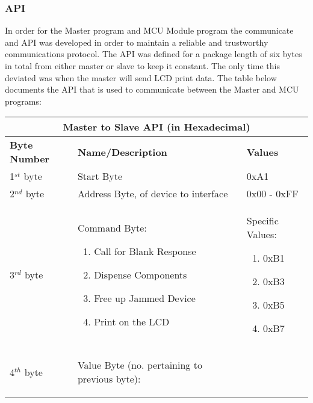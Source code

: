 \documentclass[a4paper,11pt]{article}
\numberwithin{figure}{section}
\numberwithin{table}{section}
\begin{document}
\subsubsection{API}
\label{subsubsec:API}
In order for the Master program and MCU Module program the communicate and API was developed in order to maintain a reliable and trustworthy communications protocol. The API was defined for a package length of six bytes in total from either master or slave to keep it constant. The only time this deviated was when the master will send LCD print data. The table below documents the API that is used to communicate between the Master and MCU programs:
	\begin{center}
		\begin{table}[ht]
			\centering
			\begin{tabular}{| m{3cm} | m{5cm}| m{5cm} |}
			\hline
			\multicolumn{3}{|c|}{\bfseries Master to Slave API (in Hexadecimal)}\\
			\hline
			\bfseries{Byte Number}  & \bfseries{Name/Description} & \bfseries{Values} \\
			\hline
			1$^{st}$ byte & Start Byte & 0xA1\\
			\hline
			2$^{nd}$ byte & Address Byte, of device to interface & 0x00 - 0xFF \\
			\hline
			3$^{rd}$ byte & Command Byte: \begin{enumerate}
											\setlength{\itemsep}{0pt}
   											\setlength{\parskip}{0pt}
    										\setlength{\parsep}{0pt}  
											\item Call for Blank Response
											\item Dispense Components
											\item Free up Jammed Device
											\item Print on the LCD
										\end{enumerate}	& Specific Values:\begin{enumerate}
																			\setlength{\itemsep}{0pt}
   																			\setlength{\parskip}{0pt}
    																		\setlength{\parsep}{0pt} 
																			\item 0xB1
																			\item 0xB3
																			\item 0xB5
																			\item 0xB7 
																		\end{enumerate}\\
			\hline
			4$^{th}$ byte & Value Byte (no. pertaining to previous byte): \begin{enumerate}

\end{enumerate}
\end{tabular}
\end{table}
\end{center}
\end{document}
